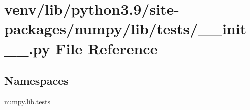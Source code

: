 \hypertarget{venv_2lib_2python3_89_2site-packages_2numpy_2lib_2tests_2____init_____8py}{}\section{venv/lib/python3.9/site-\/packages/numpy/lib/tests/\+\_\+\+\_\+init\+\_\+\+\_\+.py File Reference}
\label{venv_2lib_2python3_89_2site-packages_2numpy_2lib_2tests_2____init_____8py}
\subsection*{Namespaces}
\begin{DoxyCompactItemize}
\item 
 \hyperlink{namespacenumpy_1_1lib_1_1tests}{numpy.\+lib.\+tests}
\end{DoxyCompactItemize}
